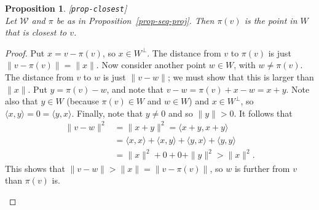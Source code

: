 \documentclass{amsart}
\newcommand{\lbl}[1]{\label{#1}\textup{[\texttt{#1}]}\ \\}
\newcommand{\lbl}{\label}
\newcommand{\ip}[1]     {\langle #1\rangle}
\newcommand{\CW}        {{\mathcal{W}}}
\renewcommand{\:}       {\colon}
\newtheorem{proposition}[theorem]{Proposition}
\theoremstyle{definition}
\begin{document}
\begin{proposition}\lbl{prop-closest}
 Let $\CW$ and $\pi$ be as in
 Proposition~\ref{prop-seq-proj}.  Then $\pi(v)$ is the
 point in $W$ that is closest to $v$.
\end{proposition}
\begin{proof}
 Put $x=v-\pi(v)$, so $x\in W^\perp$.  The distance from $v$
 to $\pi(v)$ is just $\|v-\pi(v)\|=\|x\|$.  Now consider
 another point $w\in W$, with $w\neq\pi(v)$.  The distance
 from $v$ to $w$ is just $\|v-w\|$; we must show that this
 is larger than $\|x\|$.  Put $y=\pi(v)-w$, and note that
 $v-w=\pi(v)+x-w=x+y$.  Note also that $y\in W$ (because
 $\pi(v)\in W$ and $w\in W$) and $x\in W^\perp$, so
 $\ip{x,y}=0=\ip{y,x}$.  Finally, note that $y\neq 0$ and so
 $\|y\|>0$.  It follows that
 \begin{align*}
  \|v-w\|^2 &= \|x+y\|^2 = \ip{x+y,x+y} \\
            &= \ip{x,x} + \ip{x,y} + \ip{y,x} + \ip{y,y} \\
            &= \|x\|^2 + 0 + 0 + \|y\|^2 > \|x\|^2.
 \end{align*}
 This shows that $\|v-w\|>\|x\|=\|v-\pi(v)\|$, so $w$ is
 further from $v$ than $\pi(v)$ is.
 \begin{center}
 \end{center}
\end{proof}
\end{document}
